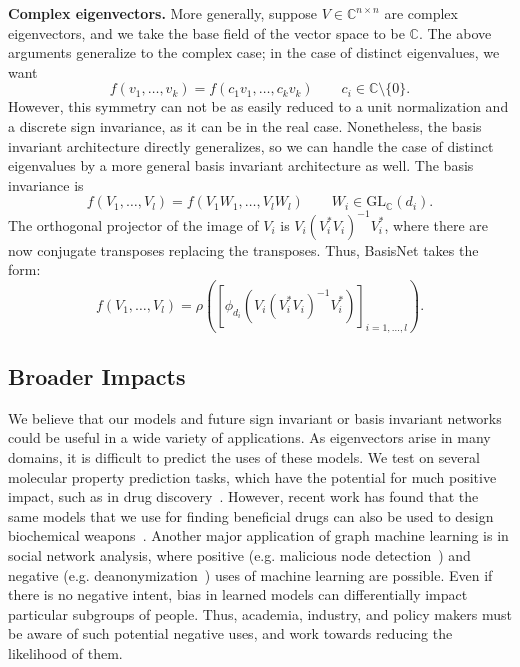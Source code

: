 \documentclass{article} \usepackage{iclr2023_conference,times}
\newcommand{\CC}{\mathbb C}
\newcommand{\mrm}[1]{\mathrm{#1}}
\begin{document}
\textbf{Complex eigenvectors.} More generally, suppose $V \in \CC^{n \times n}$ are complex eigenvectors, and we take the base field of the vector space to be $\CC$. The above arguments generalize to the complex case; in the case of distinct eigenvalues, we want
\begin{equation}
    f(v_1, \ldots, v_k) = f(c_1 v_1, \ldots, c_k v_k) \qquad c_i \in \CC \setminus \{0\}.
\end{equation}
However, this symmetry can not be as easily reduced to a unit normalization and a discrete sign invariance, as it can be in the real case. Nonetheless, the basis invariant architecture directly generalizes, so we can handle the case of distinct eigenvalues by a more general basis invariant architecture as well. The basis invariance is
\begin{equation}
    f(V_1, \ldots, V_l) = f(V_1 W_1, \ldots, V_l W_l) \qquad W_i \in \mrm{GL}_{\CC}(d_i).
\end{equation}
The orthogonal projector of the image of $V_i$ is $V_i(V_i^* V_i)^{-1}V_i^*$, where there are now conjugate transposes replacing the transposes. Thus, BasisNet takes the form:
\begin{equation}
    f(V_1, \ldots, V_l) = \rho\left(\left[\phi_{d_i}(V_i (V_i^* V_i)^{-1} V_i^*) \right]_{i=1, \ldots, l} \right).
\end{equation}

\subsection{Broader Impacts}\label{appendix:broader_impact}

We believe that our models and future sign invariant or basis invariant networks could be useful in a wide variety of applications. As eigenvectors arise in many domains, it is difficult to predict the uses of these models. We test on several molecular property prediction tasks, which have the potential for much positive impact, such as in drug discovery~\citep{stokes2020deep}. However, recent work has found that the same models that we use for finding beneficial drugs can also be used to design biochemical weapons~\citep{urbina2022dual}. Another major application of graph machine learning is in social network analysis, where positive (e.g. malicious node detection~\citep{pandit2007netprobe}) and negative (e.g. deanonymization~\citep{narayanan2009anonymizing}) uses of machine learning are possible. Even if there is no negative intent, bias in learned models can differentially impact particular subgroups of people. Thus, academia, industry, and policy makers must be aware of such potential negative uses, and work towards reducing the likelihood of them. 
\end{document}
